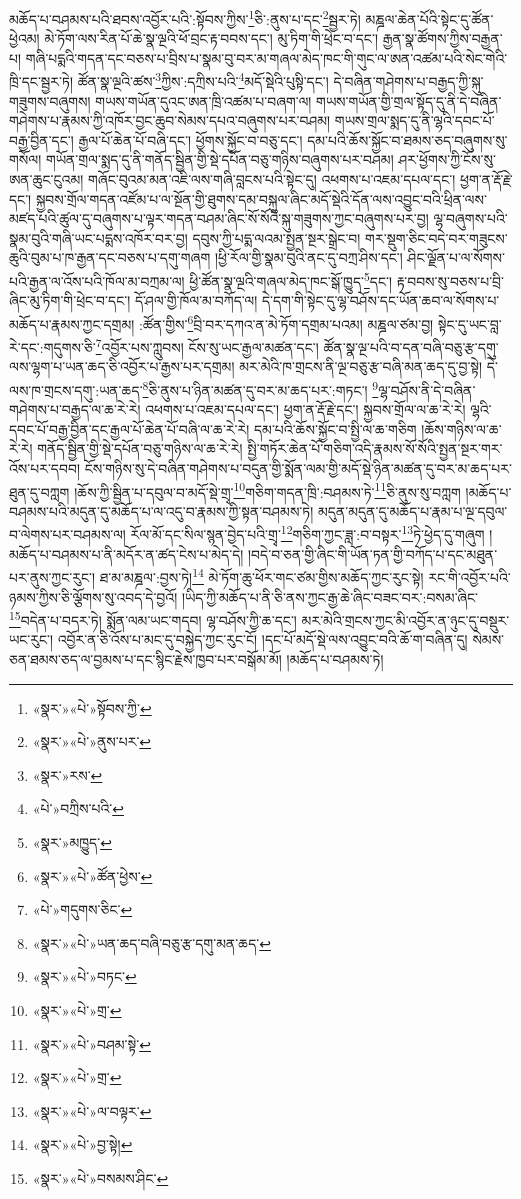 མཆོད་པ་བཤམས་པའི་ཐབས་འབྱོར་པའི་:སྟོབས་ཀྱིས་\footnote{«སྣར་»«པེ་»སྟོབས་ཀྱི་}ཅི་:ནུས་པ་དང་\footnote{«སྣར་»«པེ་»ནུས་པར་}སྦྱར་ཏེ། མཎྜལ་ཆེན་པོའི་སྟེང་དུ་ཚོན་ཕྱེའམ། མེ་ཏོག་ལས་རིན་པོ་ཆེ་སྣ་ལྔའི་ཕོ་བྲང་རྟ་བབས་དང་། མུ་ཏིག་གི་ཕྲེང་བ་དང་། རྒྱན་སྣ་ཚོགས་ཀྱིས་བརྒྱན་པ། གཞི་པདྨའི་གདན་དང་བཅས་པ་བྲིས་པ་སྣམ་བུ་བར་མ་གཞལ་མེད་ཁང་གི་གུང་ལ་ཨན་འཚམ་པའི་སེང་གེའི་ཁྲི་དང་སྦྱར་ཏེ། ཚོན་སྣ་ལྔའི་ཚས་\footnote{«སྣར་»རས་}ཀྱིས་:དཀྲིས་པའི་\footnote{«པེ་»བཀྲིས་པའི་}མདོ་སྡེའི་པུསྟི་དང་། དེ་བཞིན་གཤེགས་པ་བརྒྱད་ཀྱི་སྐུ་གཟུགས་བཞུགས། གཡས་གཡོན་དུའང་ཨན་ཁྲི་འཚམ་པ་བཞག་ལ། གཡས་གཡོན་གྱི་གྲལ་སྟོད་དུ་ནི་དེ་བཞིན་གཤེགས་པ་རྣམས་ཀྱི་འཁོར་བྱང་ཆུབ་སེམས་དཔའ་བཞུགས་པར་བཤམ། གཡས་གྲལ་སྨད་དུ་ནི་ལྷའི་དབང་པོ་བརྒྱ་བྱིན་དང་། རྒྱལ་པོ་ཆེན་པོ་བཞི་དང་། ཕྱོགས་སྐྱོང་བ་བཅུ་དང་། དམ་པའི་ཆོས་སྐྱོང་བ་ཐམས་ཅད་བཞུགས་སུ་གསོལ། གཡོན་གྲལ་སྨད་དུ་ནི་གནོད་སྦྱིན་གྱི་སྡེ་དཔོན་བཅུ་གཉིས་བཞུགས་པར་བཤམ། ཤར་ཕྱོགས་ཀྱི་ངོས་སུ་ཨན་ཆུང་ངུའམ། གཞོང་བུའམ་མན་འཇི་ལས་གཞི་བླངས་པའི་སྟེང་དུ། འཕགས་པ་འཇམ་དཔལ་དང་། ཕྱག་ན་རྡོ་རྗེ་དང་། སྐྱབས་གྲོལ་གདན་འཛོམ་པ་ལ་སྔོན་གྱི་ཐུགས་དམ་བསྐུལ་ཞིང་མདོ་སྡེའི་དོན་ལས་འབྱུང་བའི་ཕྲིན་ལས་མཛད་པའི་ཚུལ་དུ་བཞུགས་པ་ལྟར་གདན་བཤམ་ཞིང་སོ་སོའི་སྐུ་གཟུགས་ཀྱང་བཞུགས་པར་བྱ། ལྷ་བཞུགས་པའི་སྣམ་བུའི་གཞི་ཡང་པདྨས་འཁོར་བར་བྱ། དབུས་ཀྱི་པདྨ་ལའམ་སྤྱན་སྔར་སྒྲེང་བ། གར་སྡུག་ཅིང་བདེ་བར་གཟུངས་ཆུའི་བུམ་པ་ཁ་རྒྱན་དང་བཅས་པ་དགུ་གཞག །ཕྱི་རོལ་གྱི་སྣམ་བུའི་ནང་དུ་བཀྲ་ཤིས་དང་། ཤིང་ལྗོན་པ་ལ་སོགས་པའི་རྒྱན་ལ་འོས་པའི་ཁོལ་མ་བཀྲམ་ལ། ཕྱི་ཚོན་སྣ་ལྔའི་གཞལ་མེད་ཁང་སྒོ་ཁྱུད་\footnote{«སྣར་»མཁྱུད་}དང་། རྟ་བབས་སུ་བཅས་པ་བྲི་ཞིང་མུ་ཏིག་གི་ཕྲེང་བ་དང་། དོ་ཤལ་གྱི་ཁོལ་མ་བཀོད་ལ། དེ་དག་གི་སྟེང་དུ་ལྷ་བཤོས་དང་ཡོན་ཆབ་ལ་སོགས་པ་མཆོད་པ་རྣམས་ཀྱང་དགྲམ། :ཚོན་གྱིས་\footnote{«སྣར་»«པེ་»ཚོན་ཕྱེས་}བྲི་བར་དཀའ་ན་མེ་ཏོག་དགྲམ་པའམ། མཎྜལ་ཙམ་བྱ། སྟེང་དུ་ཡང་བླ་རེ་དང་:གདུགས་ཅི་\footnote{«པེ་»གདུགས་ཅིང་}འབྱོར་པས་ཀླུབས། ངོས་སུ་ཡང་རྒྱལ་མཚན་དང་། ཚོན་སྣ་ལྔ་པའི་བ་དན་བཞི་བཅུ་རྩ་དགུ་ལས་ལྷག་པ་ཡན་ཆད་ཅི་འབྱོར་པ་རྒྱས་པར་དགྲམ། མར་མེའི་ཁ་གྲངས་ནི་ལྔ་བཅུ་རྩ་བཞི་མན་ཆད་དུ་བྱ་སྟེ། དེ་ལས་ཁ་གྲངས་དགུ་:ཡན་ཆད་\footnote{«སྣར་»«པེ་»ཡན་ཆད་བཞི་བཅུ་རྩ་དགུ་མན་ཆད་}ཅི་ནུས་པ་ཉིན་མཚན་དུ་བར་མ་ཆད་པར་:གཏང་། \footnote{«སྣར་»«པེ་»བཏང་}ལྷ་བཤོས་ནི་དེ་བཞིན་གཤེགས་པ་བརྒྱད་ལ་ཆ་རེ་རེ། འཕགས་པ་འཇམ་དཔལ་དང་། ཕྱག་ན་རྡོ་རྗེ་དང་། སྐྱབས་གྲོལ་ལ་ཆ་རེ་རེ། ལྷའི་དབང་པོ་བརྒྱ་བྱིན་དང་རྒྱལ་པོ་ཆེན་པོ་བཞི་ལ་ཆ་རེ་རེ། དམ་པའི་ཆོས་སྐྱོང་བ་སྤྱི་ལ་ཆ་གཅིག །ཆོས་གཉིས་ལ་ཆ་རེ་རེ། གནོད་སྦྱིན་གྱི་སྡེ་དཔོན་བཅུ་གཉིས་ལ་ཆ་རེ་རེ། སྤྱི་གཏོར་ཆེན་པོ་གཅིག་འདི་རྣམས་སོ་སོའི་སྤྱན་སྔར་གར་འོས་པར་དབབ། ངོས་གཉིས་སུ་དེ་བཞིན་གཤེགས་པ་བདུན་གྱི་སྨོན་ལམ་གྱི་མདོ་སྡེ་ཉིན་མཚན་དུ་བར་མ་ཆད་པར་ཐུན་དུ་བཀླག །ཆོས་ཀྱི་སྦྱིན་པ་དབུལ་བ་མདོ་སྡེ་གྲྭ་\footnote{«སྣར་»«པེ་»གྲ་}གཅིག་གདན་ཁྲི་:བཤམས་ཏེ་\footnote{«སྣར་»«པེ་»བཤམ་སྟེ་}ཅི་ནུས་སུ་བཀླག །མཆོད་པ་བཤམས་པའི་མདུན་དུ་མཆོད་པ་ལ་འདུ་བ་རྣམས་ཀྱི་སྟན་བཤམས་ཏེ། མདུན་མདུན་དུ་མཆོད་པ་རྣམ་པ་ལྔ་དབུལ་བ་ལེགས་པར་བཤམས་ལ། རོལ་མོ་དང་སིལ་སྙན་བྱེད་པའི་གྲྭ་\footnote{«སྣར་»«པེ་»གྲ་}གཅིག་ཀྱང་ཟླ་:བ་བསྟར་\footnote{«སྣར་»«པེ་»ལ་བལྟར་}ཏེ་ཕྱེད་དུ་གཞུག །མཆོད་པ་བཤམས་པ་ནི་མདོར་ན་ཚད་ངེས་པ་མེད་དེ། །བདེ་བ་ཅན་གྱི་ཞིང་གི་ཡོན་ཏན་གྱི་བཀོད་པ་དང་མཐུན་པར་ནུས་ཀྱང་རུང་། ཐ་མ་མཎྜལ་:བྱས་ཏེ།\footnote{«སྣར་»«པེ་»བྱ་སྟེ།} མེ་ཏོག་ཆུ་ཕོར་གང་ཙམ་གྱིས་མཆོད་ཀྱང་རུང་སྟེ། རང་གི་འབྱོར་པའི་ཉམས་ཀྱིས་ཅི་ལྕོགས་སུ་འབད་དེ་བྱའོ། །ཡིད་ཀྱི་མཆོད་པ་ནི་ཅི་ནས་ཀྱང་རྒྱ་ཆེ་ཞིང་བཟང་བར་:བསམ་ཞིང་\footnote{«སྣར་»«པེ་»བསམས་ཤིང་}བདེན་པ་བདར་ཏེ། སྨོན་ལམ་ཡང་གདབ། ལྷ་བཤོས་ཀྱི་ཆ་དང་། མར་མེའི་གྲངས་ཀྱང་མི་འབྱོར་ན་ཉུང་དུ་བསྡུར་ཡང་རུང་། འབྱོར་ན་ཅི་འོས་པ་མང་དུ་བསྐྱེད་ཀྱང་རུང་ངོ། །དང་པོ་མདོ་སྡེ་ལས་འབྱུང་བའི་ཆོ་ག་བཞིན་དུ། སེམས་ཅན་ཐམས་ཅད་ལ་བྱམས་པ་དང་སྙིང་རྗེས་ཁྱབ་པར་བསྒོམ་མོ། །མཆོད་པ་བཤམས་ཏེ། 
